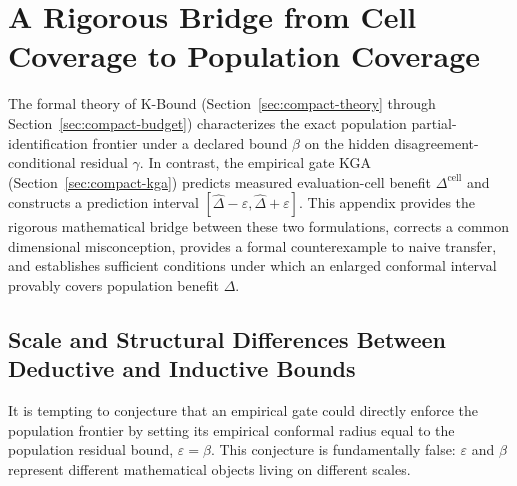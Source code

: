 \appendix
\providecommand{\KBMainRef}[3]{#2~\ref{#1}}
\providecommand{\KBMainEqRef}[2]{Eq.~\eqref{#1}}

\section{A Rigorous Bridge from Cell Coverage to Population Coverage}
\label{app:population-transfer}

The formal theory of K-Bound (\KBMainRef{sec:compact-theory}{Section}{the main theory section} through \KBMainRef{sec:compact-budget}{Section}{the main residual-budget section}) characterizes the
exact population partial-identification frontier under a declared bound $\beta$ on the hidden
disagreement-conditional residual $\gamma$. In contrast, the empirical gate KGA (\KBMainRef{sec:compact-kga}{Section}{the main KGA specification})
predicts measured evaluation-cell benefit $\Delta^{\mathrm{cell}}$ and constructs a prediction
interval $[\widehat\Delta-\varepsilon, \widehat\Delta+\varepsilon]$. This appendix provides the
rigorous mathematical bridge between these two formulations, corrects a common dimensional
misconception, provides a formal counterexample to naive transfer, and establishes sufficient
conditions under which an enlarged conformal interval provably covers population benefit $\Delta$.

\subsection{Scale and Structural Differences Between Deductive and Inductive Bounds}
\label{app:unit-scaling}

It is tempting to conjecture that an empirical gate could directly enforce the population frontier
by setting its empirical conformal radius equal to the population residual bound, $\varepsilon = \beta$.
This conjecture is fundamentally false: $\varepsilon$ and $\beta$ represent different mathematical objects
living on different scales.

